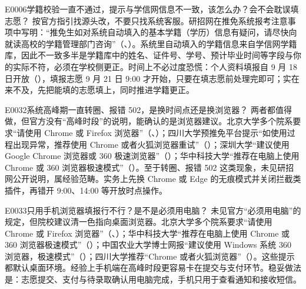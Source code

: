 \begin{qa}{E0006}{学籍校验一直不通过，提示与学信网信息不一致，该怎么办？会不会耽误填志愿？}
按官方指引找源头改，不要只找系统客服。研招网在推免系统报考注意事项中写明：“推免生如对系统自动填入的基本学籍（学历）信息有疑问，请尽快向就读高校的学籍管理部门咨询”（、）。系统里自动填入的学籍信息来自学信网学籍库，因此不一致多半是学籍库中的姓名、证件号、学号、预计毕业时间等字段与你的实际不符，必须在学校侧更正。时间上不必过度恐慌：个人资料填报自 9 月 18 日开放（），填报志愿 9 月 21 日 9:00 才开始，只要在填志愿前处理完即可；实在来不及，先把能填的志愿填上，同时推进学籍更正。
\end{qa}

\begin{qa}{E0032}{系统高峰期一直转圈、报错 502，是换时间点还是换浏览器？}
两者都值得做，但官方没有“高峰时段”的说明，能确认的是浏览器建议。北京大学多个院系要求“请使用 Chrome 或 Firefox 浏览器”（、）；四川大学预推免平台提示“如使用过程出现异常，推荐使用 Chrome 或者火狐浏览器重试”（）；深圳大学“建议使用 Google Chrome 浏览器或 360 极速浏览器”（）；华中科技大学“推荐在电脑上使用 Chrome 或 360 浏览器极速模式”（）。至于转圈、报错 502 这类现象，未见研招网公开说明，属经验范畴。实务上先换 Chrome 或 Edge 的无痕模式并关闭拦截类插件，再错开 9:00、14:00 等开放时点操作。
\end{qa}

\begin{qa}{E0033}{只用手机浏览器填报行不行？是不是必须用电脑？}
未见官方“必须用电脑”的规定，但院校建议清一色指向桌面浏览器。北京大学多个院系要求“请使用 Chrome 或 Firefox 浏览器”（、）；华中科技大学“推荐在电脑上使用 Chrome 或 360 浏览器极速模式”（）；中国农业大学博士网报“建议使用 Windows 系统 360 浏览器，极速模式”（）；四川大学推荐“Chrome 或者火狐浏览器”（）。这些提示都默认桌面环境。经验上手机端在高峰时段更容易卡在提交与支付环节。稳妥做法是：志愿提交、支付与待录取确认用电脑完成，手机只用于查看通知和接收短信。
\end{qa}


